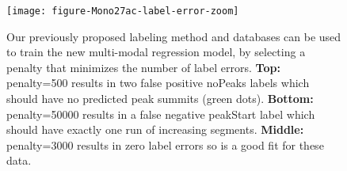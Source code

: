 \documentclass{article}
\begin{document}

\begin{figure}
  \centering
  \texttt{[image: figure-Mono27ac-label-error-zoom]}
  \caption{Our previously proposed labeling method and databases can
    be used to train the new multi-modal regression model, by
    selecting a penalty that minimizes the number of label
    errors. \textbf{Top:} penalty=500 results in two false positive
    noPeaks labels which should have no predicted peak summits (green
    dots). \textbf{Bottom:} penalty=50000 results in a false negative
    peakStart label which should have exactly one run of increasing
    segments. \textbf{Middle:} penalty=3000 results in zero label
    errors so is a good fit for these data.}
  \label{fig:label-error}
\end{figure}

\end{document}
